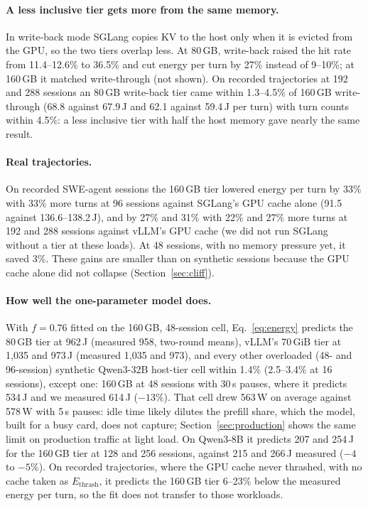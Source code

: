 \paragraph{A less inclusive tier gets more from the same memory.} In write-back mode SGLang copies KV to the host only
when it is evicted from the GPU, so the two tiers overlap less. At 80\,GB, write-back raised the hit rate from 11.4--12.6\%
to 36.5\% and cut energy per turn by 27\% instead of 9--10\%; at 160\,GB it matched write-through (not shown). On recorded
trajectories at 192 and 288 sessions an 80\,GB write-back tier came within 1.3--4.5\% of 160\,GB write-through
(68.8 against 67.9\,J and 62.1 against 59.4\,J per turn) with turn counts within 4.5\%: a less inclusive tier with half the host memory gave nearly the same
result.

\paragraph{Real trajectories.} On recorded SWE-agent sessions the 160\,GB tier lowered energy per turn by 33\% with
33\% more turns at 96 sessions against SGLang's GPU cache alone (91.5 against 136.6--138.2\,J), and by 27\% and 31\%
with 22\% and 27\% more turns at 192 and 288 sessions against vLLM's GPU cache (we did not run SGLang without a
tier at these loads). At 48 sessions, with no memory pressure yet, it
saved 3\%. These gains are smaller than on synthetic sessions because the GPU cache alone did not
collapse (Section~\ref{sec:cliff}).

\paragraph{How well the one-parameter model does.} With $f=0.76$ fitted on the 160\,GB, 48-session cell,
Eq.~\eqref{eq:energy} predicts the 80\,GB tier at 962\,J (measured 958, two-round means), vLLM's 70\,GiB tier at 1,035 and 973\,J (measured 1,035
and 973), and every other overloaded (48- and 96-session) synthetic Qwen3-32B host-tier cell within 1.4\% (2.5--3.4\% at 16
sessions), except one: 160\,GB at 48 sessions with 30\,s pauses, where it
predicts 534\,J and we measured 614\,J ($-13\%$). That cell drew 563\,W on average against 578\,W with 5\,s pauses: idle time likely dilutes
the prefill share, which the model, built for a busy card, does not capture; Section~\ref{sec:production} shows the same limit on production traffic at light load. On Qwen3-8B it predicts 207 and 254\,J for the 160\,GB tier at
128 and 256 sessions, against 215 and 266\,J measured ($-4$ to $-5\%$). On recorded trajectories,
where the GPU cache never thrashed, with no cache taken as $E_{\text{thrash}}$, it predicts the 160\,GB tier 6--23\% below the
measured energy per turn, so the fit does not transfer to those workloads.

